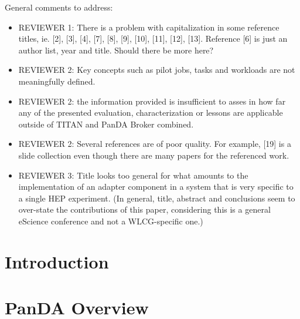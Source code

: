 \documentclass[conference]{IEEEtran}
\begin{document}
\ifreview
General comments to address:
\begin{itemize}
    \color{red} 
    \item REVIEWER 1: There is a problem with capitalization in some
    reference titles, ie. [2], [3], [4], [7], [8], [9], [10], [11], [12],
    [13]. Reference [6] is just an author list, year and title. Should there
    be more here?
    \item REVIEWER 2:  Key concepts such as pilot jobs, tasks and workloads
    are not meaningfully defined.
    \item REVIEWER 2: the information provided is insufficient to asses in
    how far any of the presented evaluation, characterization or lessons are
    applicable outside of TITAN and PanDA Broker combined.
    \item REVIEWER 2: Several references are of poor quality. For example,
    [19] is a slide collection even though there are many papers for the
    referenced work.
    \item REVIEWER 3: Title looks too general for what amounts to the
    implementation of an adapter component in a system that is very specific
    to a single HEP experiment. (In general, title, abstract and conclusions
    seem to over-state the contributions of this paper, considering this is a
    general eScience conference and not a WLCG-specific one.)
\end{itemize}
\fi

\begin{abstract}

\end{abstract}


\section{Introduction}\label{sec:intro}



\section{PanDA Overview}\label{sec:panda_overview}

\end{document}
